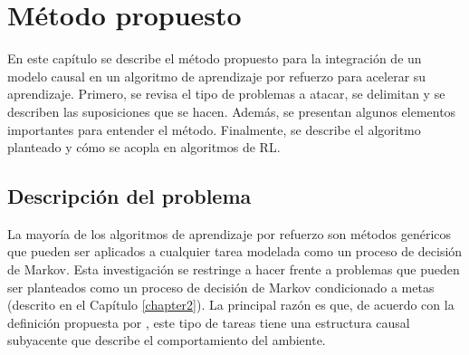 \chapter{Método propuesto}\label{chapter4}

\graphicspath{{Chapter4/Figs/}}

En este capítulo se describe el método propuesto para la integración
de un modelo causal en un algoritmo de aprendizaje por refuerzo para
acelerar su aprendizaje. Primero, se revisa el tipo de problemas a atacar, se delimitan
y se describen las suposiciones que se hacen. Además, se presentan algunos elementos 
importantes para entender el método.
Finalmente, se describe el algoritmo planteado y cómo se acopla en algoritmos de RL. 

    
\section{Descripción del problema}

La mayoría de los algoritmos de aprendizaje por refuerzo son métodos genéricos que pueden ser aplicados a cualquier tarea modelada como un proceso de decisión de Markov.
Esta investigación se restringe a hacer frente
a problemas que pueden ser planteados como un proceso de decisión de Markov condicionado a metas (descrito en el Capítulo \ref{chapter2}). 
La principal razón es que, de acuerdo con la definición propuesta por \citet{nair2019causal}, este tipo de tareas tiene una estructura causal subyacente que describe el comportamiento del ambiente.

